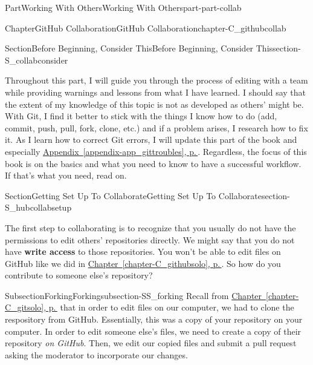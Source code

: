 \documentclass[twoside,10pt,]{book}
\newcommand{\xreffont}{\relax}
\newcommand{\terminology}[1]{\textbf{#1}}
\begin{document}
\begin{partptx}{Part}{Working With Others}{}{Working With Others}{}{}{part-part-collab}
\begin{chapterptx}{Chapter}{GitHub Collaboration}{}{GitHub Collaboration}{}{}{chapter-C_githubcollab}
\begin{sectionptx}{Section}{Before Beginning, Consider This}{}{Before Beginning, Consider This}{}{}{section-S_collabconsider}
\par
Throughout this part, I will guide you through the process of editing with a team while providing warnings and lessons from what I have learned. I should say that the extent of my knowledge of this topic is not as developed as others' might be. With Git, I find it better to stick with the things I know how to do (add, commit, push, pull, fork, clone, etc.) and if a problem arises, I research how to fix it. As I learn how to correct Git errors, I will update this part of the book and especially \hyperref[appendix-app_gittroubles]{Appendix~{\xreffont\ref{appendix-app_gittroubles}}, p.\,\pageref{appendix-app_gittroubles}}. Regardless, the focus of this book is on the basics and what you need to know to have a successful workflow. If that's what you need, read on.%
\end{sectionptx}
%
%
\typeout{************************************************}
\typeout{************************************************}
%
\begin{sectionptx}{Section}{Getting Set Up To Collaborate}{}{Getting Set Up To Collaborate}{}{}{section-S_hubcollabsetup}
%
%
\begin{introduction}{}%
The first step to collaborating is to recognize that you usually do not have the permissions to edit others' repositories directly. We might say that you do not have \terminology{write access} to those repositories. You won't be able to edit files on GitHub like we did in \hyperref[chapter-C_githubsolo]{Chapter~{\xreffont\ref{chapter-C_githubsolo}}, p.\,\pageref{chapter-C_githubsolo}}. So how do you contribute to someone else's repository?%
\end{introduction}%
%
%
\typeout{************************************************}
\typeout{************************************************}
%
\begin{subsectionptx}{Subsection}{Forking}{}{Forking}{}{}{subsection-SS_forking}
%
%
Recall from \hyperref[chapter-C_gitsolo]{Chapter~{\xreffont\ref{chapter-C_gitsolo}}, p.\,\pageref{chapter-C_gitsolo}} that in order to edit files on our computer, we had to clone the respository from GitHub. Essentially, this was a copy of your repository on your computer. In order to edit someone else's files, we need to create a copy of their repository \emph{on GitHub}. Then, we edit our copied files and submit a pull request asking the moderator to incorporate our changes.%

\end{subsectionptx}
\end{sectionptx}
\end{chapterptx}
\end{partptx}
\end{document}
